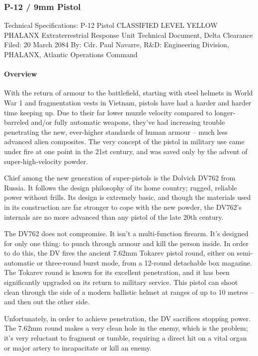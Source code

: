 \subsubsection*{P-12 / 9mm Pistol}
Technical Specifications: P-12 Pistol
CLASSIFIED LEVEL YELLOW
PHALANX Extraterrestrial Response Unit
Technical Document, Delta Clearance
Filed: 20 March 2084
By: Cdr. Paul Navarre, R&D: Engineering Division, PHALANX, Atlantic Operations Command
\paragraph*{Overview}
With the return of armour to the battlefield, starting with steel helmets in World War 1 and fragmentation vests in Vietnam, pistols have had a harder and harder time keeping up. Due to their far lower muzzle velocity compared to longer-barreled and/or fully automatic weapons, they've had increasing trouble penetrating the new, ever-higher standards of human armour -- much less advanced alien composites. The very concept of the pistol in military use came under fire at one point in the 21st century, and was saved only by the advent of super-high-velocity powder.

Chief among the new generation of super-pistols is the Dolvich DV762 from Russia. It follows the design philosophy of its home country; rugged, reliable power without frills. Its design is extremely basic, and though the materials used in its construction are far stronger to cope with the new powder, the DV762's internals are no more advanced than any pistol of the late 20th century.

The DV762 does not compromise. It isn't a multi-function firearm. It's designed for only one thing: to punch through armour and kill the person inside. In order to do this, the DV fires the ancient 7.62mm Tokarev pistol round, either on semi-automatic or three-round burst mode, from a 12-round detachable box magazine. The Tokarev round is known for its excellent penetration, and it has been significantly upgraded on its return to military service. This pistol can shoot clean through the side of a modern ballistic helmet at ranges of up to 10 metres -- and then out the other side.

Unfortunately, in order to achieve penetration, the DV sacrifices stopping power. The 7.62mm round makes a very clean hole in the enemy, which is the problem; it's very reluctant to fragment or tumble, requiring a direct hit on a vital organ or major artery to incapacitate or kill an enemy.

